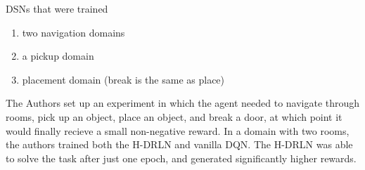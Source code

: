 DSNs that were trained
\begin{enumerate}
\item
two navigation domains
\item
a pickup domain
\item
placement domain (break is the same as place)
\end{enumerate}

The Authors set up an experiment in which the agent needed to navigate through rooms, pick up an object, place an object, and break a door, at which point it would finally recieve a small non-negative reward. In a domain with two rooms, the authors trained both the H-DRLN and vanilla DQN. The H-DRLN was able to solve the task after just one epoch, and generated significantly higher rewards.